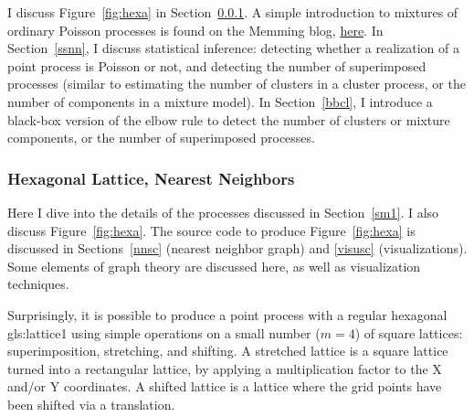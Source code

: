 \documentclass[10pt]{article}
\begin{document}
I discuss Figure~\ref{fig:hexa} in Section~\ref{sm2}. A simple introduction to mixtures of ordinary Poisson processes is found on the Memming blog, 
\href{https://memming.wordpress.com/2012/08/28/mixture-of-point-processes/}{here}. 
In Section~\ref{ssnn}, I discuss statistical inference: detecting whether a realization of a point 
process is Poisson or not, and detecting the number of superimposed processes (similar to estimating the number of clusters in a 
\textcolor{index}{cluster process}, or the number of components in a \textcolor{index}{mixture model}).  
 In Section~\ref{bbcl}, I introduce  a black-box version of the 
\textcolor{index}{elbow rule} to detect the number of clusters or mixture components, or 
the number of superimposed processes. 

\subsubsection{Hexagonal Lattice, Nearest Neighbors}\label{sm2}

Here I dive into the details of the processes discussed in Section~\ref{sm1}. I also discuss Figure~\ref{fig:hexa}. The source code to produce Figure~\ref{fig:hexa} is discussed in Sections~\ref{nnsc} (nearest neighbor graph) and \ref{visusc} (visualizations). 
Some elements of \textcolor{index}{graph theory} are discussed here, as well as \textcolor{index}{visualization} techniques. 

 Surprisingly, it is possible to produce a point process with a regular hexagonal \gls{gls:lattice1}  using simple operations on a small number ($m=4$) of square lattices: superimposition, stretching, and shifting. A 
\textcolor{index}{stretched lattice} 
is a square lattice turned into a rectangular lattice, by applying a multiplication factor to the X and/or Y coordinates.  A
\textcolor{index}{shifted lattice} is a lattice where the grid points have been shifted via a translation. 
\end{document}
